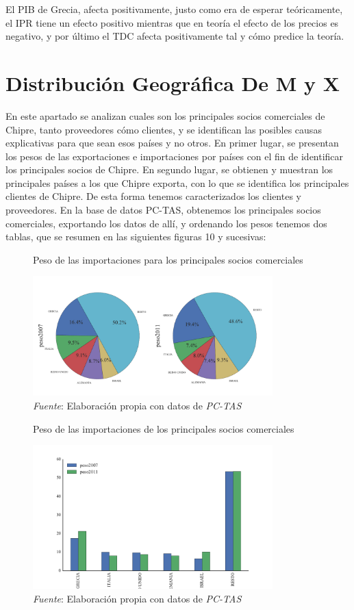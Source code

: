 \documentclass[a4paper,openright,12pt]{book}
\begin{document}
El PIB de Grecia, afecta positivamente, justo como era de esperar teóricamente, el IPR tiene un efecto positivo mientras que en teoría el efecto de los precios es negativo, y por último el TDC afecta positivamente tal y cómo predice la teoría.

\chapter{Distribución Geográfica De M y X}
\label{cap3}

En este apartado se analizan cuales son los principales socios comerciales de  Chipre, tanto proveedores cómo clientes, y se identifican las posibles causas explicativas para que sean esos países y no otros.
En primer lugar, se presentan los pesos de las exportaciones e importaciones por países con el fin de identificar los principales socios de Chipre. En segundo lugar, se obtienen y muestran los principales países a los que Chipre exporta, con lo que se identifica los principales clientes de Chipre. De esta forma tenemos caracterizados los clientes y proveedores.
En la base de datos PC-TAS, obtenemos los principales socios comerciales, exportando los datos de allí, y ordenando los pesos tenemos dos tablas, que se resumen en las siguientes figuras 10 y sucesivas:

\begin{figure}[ht]
    \centering
    \caption{Peso de las importaciones para los principales socios comerciales}
    \includegraphics[width=350px]{pie_mgeo.pdf}
    \caption*{\textit{Fuente}: Elaboración propia con datos de \textit{PC-TAS}}
    \label{pie_mgeo}
\end{figure}

\begin{figure}[ht]
    \centering
    \caption{Peso de las importaciones de los principales socios comerciales}
    \includegraphics[width=350px]{bar_mgeo.pdf}
    \caption*{\textit{Fuente}: Elaboración propia con datos de \textit{PC-TAS}}
    \label{bar_mgeo}
\end{figure}
\end{document}
